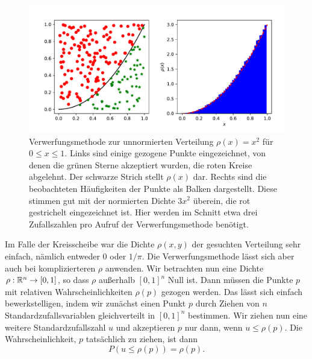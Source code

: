 \begin{figure}
  \centering
  \includegraphics[width=\textwidth]{plots/rejection}
  \caption{Verwerfungsmethode zur unnormierten Verteilung
    $\rho(x)=x^2$ für $0\le x \le 1$. Links sind einige gezogene
    Punkte eingezeichnet, von denen die grünen Sterne akzeptiert
    wurden, die roten Kreise abgelehnt. Der schwarze Strich stellt
    $\rho(x)$ dar. Rechts sind die beobachteten Häufigkeiten der
    Punkte als Balken dargestellt. Diese stimmen gut mit der
    normierten Dichte $3x^2$ überein, die rot gestrichelt
    eingezeichnet ist. Hier werden im Schnitt etwa drei Zufallszahlen
    pro Aufruf der Verwerfungsmethode benötigt.}
  \label{fig:rejection}
\end{figure}

Im Falle der Kreisscheibe war die Dichte $\rho(x, y)$ der gesuchten
Verteilung sehr einfach, nämlich entweder $0$ oder $1/\pi$. Die
Verwerfungsmethode lässt sich aber auch bei komplizierteren $\rho$
anwenden. Wir betrachten nun eine Dichte $\rho:\mathbb{R}^n\to [0,1]$, so
dass $\rho$ außerhalb $[0,1]^n$ Null ist. Dann müssen die Punkte $p$
mit relativen Wahrscheinlichkeiten $\rho(p)$ gezogen werden. Das lässt
sich einfach bewerkstelligen, indem wir zunächst einen Punkt $p$ durch
Ziehen von $n$ Standardzufallsvariablen gleichverteilt in $[0,1]^n$
bestimmen. Wir ziehen nun eine weitere Standardzufallszahl $u$ und
akzeptieren $p$ nur dann, wenn $u\le\rho(p)$. Die Wahrscheinlichkeit,
$p$ tatsächlich zu ziehen, ist dann
\begin{equation}
  P(u \le\rho(p)) = \rho(p).
\end{equation}


